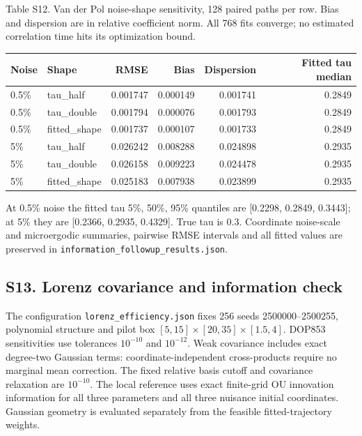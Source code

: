 \documentclass[
  american,
  11pt,
]{article}
\begin{document}
\begin{center}
\begin{minipage}{\linewidth}
Table S12. Van der Pol noise-shape sensitivity, 128 paired paths per
row. Bias and dispersion are in relative coefficient norm. All 768 fits
converge; no estimated correlation time hits its optimization bound.

\small\setlength{\tabcolsep}{3pt}
\begin{tabular}{@{}llrrrr@{}}
\toprule\noalign{}
Noise & Shape & RMSE & Bias & Dispersion & Fitted tau median \\
\midrule\noalign{}
0.5\% & tau\_half & 0.001747 & 0.000149 & 0.001741 & 0.2849 \\
0.5\% & tau\_double & 0.001794 & 0.000076 & 0.001793 & 0.2849 \\
0.5\% & fitted\_shape & 0.001737 & 0.000107 & 0.001733 & 0.2849 \\
5\% & tau\_half & 0.026242 & 0.008288 & 0.024898 & 0.2935 \\
5\% & tau\_double & 0.026158 & 0.009223 & 0.024478 & 0.2935 \\
5\% & fitted\_shape & 0.025183 & 0.007938 & 0.023899 & 0.2935 \\
\bottomrule
\end{tabular}
\end{minipage}
\end{center}

At 0.5\% noise the fitted tau 5\%, 50\%, 95\% quantiles are {[}0.2298,
0.2849, 0.3443{]}; at 5\% they are {[}0.2366, 0.2935, 0.4329{]}. True
tau is 0.3. Coordinate noise-scale and microergodic summaries, pairwise
RMSE intervals and all fitted values are preserved in
\texttt{information\_followup\_results.json}.

\subsection{S13. Lorenz covariance and information
check}\label{s13.-lorenz-covariance-and-information-check}

The configuration \texttt{lorenz\_efficiency.json} fixes 256 seeds
2500000--2500255, polynomial structure and pilot box
\([5,15]\times[20,35]\times[1.5,4]\). DOP853 sensitivities use
tolerances \(10^{-10}\) and \(10^{-12}\). Weak covariance includes exact
degree-two Gaussian terms: coordinate-independent cross-products require
no marginal mean correction. The fixed relative basis cutoff and
covariance relaxation are \(10^{-10}\). The local reference uses exact
finite-grid OU innovation information for all three parameters and all
three nuisance initial coordinates. Gaussian geometry is evaluated
separately from the feasible fitted-trajectory weights.
\end{document}
